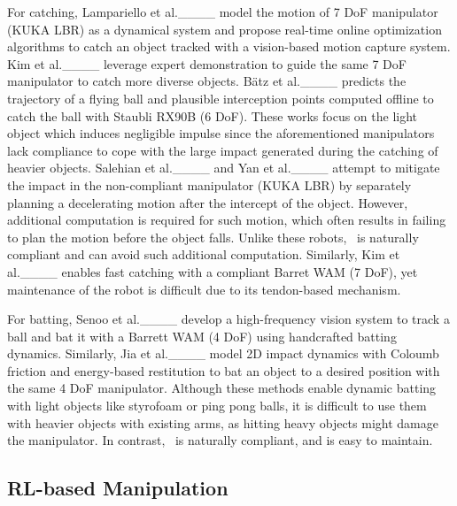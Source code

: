 For catching, Lampariello et al.____  model the motion of 7 DoF manipulator (KUKA LBR) as a dynamical system and propose real-time online optimization algorithms to catch an object tracked with a vision-based motion capture system. Kim et al.____ leverage expert demonstration to guide the same 7 DoF manipulator to catch more diverse objects.  B\"{a}tz et al.____ predicts the trajectory of a flying ball and plausible interception points computed offline to catch the ball with Staubli RX90B (6 DoF). 
These works focus on the light object which induces negligible impulse since the aforementioned manipulators lack compliance to cope with the large impact generated during the catching of heavier objects. Salehian et al.____ and Yan et al.____ attempt to mitigate the impact in the non-compliant manipulator (KUKA LBR) by separately planning a decelerating motion after the intercept of the object.  However, additional computation is required for such motion, which often results in failing to plan the motion before the object falls. 
Unlike these robots, \robot~is naturally compliant and can avoid such additional computation.  Similarly, Kim et al.____ enables fast catching with a compliant Barret WAM (7 DoF), yet maintenance of the robot is difficult due to its tendon-based mechanism.

For batting, Senoo et al.____ develop a high-frequency vision system to track a ball and bat it with a Barrett WAM (4 DoF) using handcrafted batting dynamics. Similarly, Jia et al.____ model 2D impact dynamics with Coloumb friction and energy-based restitution to bat an object to a desired position with the same 4 DoF manipulator. Although these methods enable dynamic batting with light objects like styrofoam or ping pong balls, it is difficult to use them with heavier objects with existing arms, as hitting heavy objects might damage the manipulator. In contrast, \robot~is naturally compliant, and is easy to maintain.


\subsection{RL-based Manipulation}


